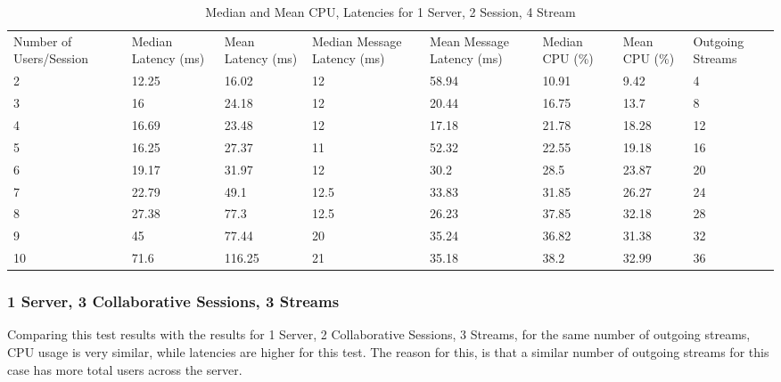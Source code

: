 \begin{table}
\caption{Median and Mean CPU, Latencies for 1 Server, 2 Session, 4 Stream}
\label{table:1serv_2sess_4str}
\begin{tabu} to\linewidth{|X[c]|X[c]|X[c]|X[c]|X[c]|X[c]|X[c]|X[c]|}
\everyrow{\hline}
\hline
Number of Users/Session & Median Latency (ms) & Mean Latency (ms) & Median Message Latency (ms) & Mean Message Latency (ms) & Median CPU (\%) & Mean CPU (\%) & Outgoing Streams\\
2 & 12.25 & 16.02 & 12 & 58.94 & 10.91 & 9.42 & 4 \\
3 & 16 & 24.18 & 12 & 20.44 & 16.75 & 13.7 & 8 \\
4 & 16.69 & 23.48 & 12 & 17.18 & 21.78 & 18.28 & 12 \\
5 & 16.25 & 27.37 & 11 & 52.32 & 22.55 & 19.18 & 16 \\
6 & 19.17 & 31.97 & 12 & 30.2 & 28.5 & 23.87 & 20 \\
7 & 22.79 & 49.1 & 12.5 & 33.83 & 31.85 & 26.27 & 24 \\
8 & 27.38 & 77.3 & 12.5 & 26.23 & 37.85 & 32.18 & 28 \\
9 & 45 & 77.44 & 20 & 35.24 & 36.82 & 31.38 & 32 \\
10 & 71.6 & 116.25 & 21 & 35.18 & 38.2 & 32.99 & 36 \\
\end{tabu}
\end{table}

\subsubsection{1 Server, 3 Collaborative Sessions, 3 Streams}
\label{sec:1serv_3sess_3str}

Comparing this test results with the results for 1 Server, 2 Collaborative Sessions, 3 Streams, for the same number of outgoing streams, CPU usage is very similar, while latencies are higher for this test. The reason for this, is that a similar number of outgoing streams for this case has more total users across the server.

